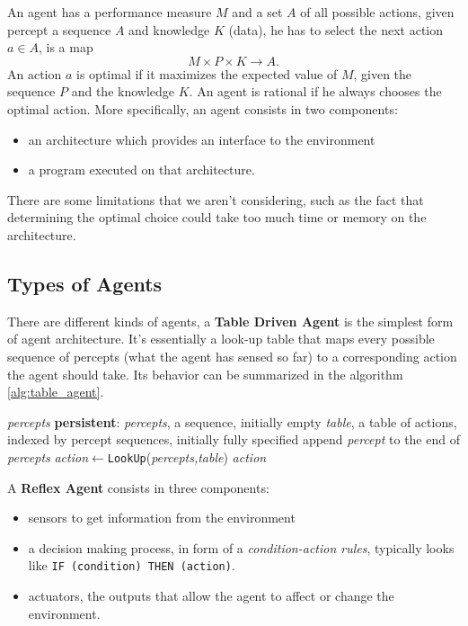 \documentclass[10pt, letterpaper]{report}
\begin{document}
An agent has a performance measure $M$ and a set $A$ of all possible actions, given percept a sequence $A$ and knowledge $K$ (data), he has to select the next action $a\in A$, is a map\begin{equation}
    M\times P\times K \longrightarrow A.
\end{equation} 
An action $a$ is optimal if it maximizes the expected value of $M$, given the sequence $P$ and the knowledge $K$. An agent is rational if he always chooses the optimal action. More specifically, an agent consists in two components:\begin{itemize}
    \item an architecture which provides an interface to the environment
    \item a program executed on that architecture.
\end{itemize}
There are some limitations that we aren't considering, such as the fact that determining the optimal choice could take too much time or memory on the architecture.

\subsection{Types of Agents}
There are different kinds of agents, a \textbf{Table Driven Agent} is the simplest form of agent architecture. It's essentially a look-up table that maps every possible sequence of percepts (what the agent has sensed so far) to a corresponding action the agent should take. Its behavior can be summarized in the algorithm \ref{alg:table_agent}.

\begin{algorithm}
    \caption{Table Driven Agent}\label{alg:table_agent}
    \begin{algorithmic}
    \Require \textit{percepts}
    \State \textbf{persistent}: \textit{percepts}, a sequence, initially empty
    \State\hphantom{persistent: .} \textit{table}, a table of actions, indexed by percept sequences, initially fully specified
    \State append \textit{percept} to the end of \textit{percepts} 
    \State \textit{action}$\leftarrow$\texttt{LookUp}(\textit{percepts,table})
    \State\Return \textit{action}
    \end{algorithmic}
\end{algorithm}
\bigskip


A \textbf{Reflex Agent} consists in three components:\begin{itemize}
    \item sensors to get information from the environment
    \item a decision making process, in form of a \textit{condition-action rules}, typically looks like \texttt{IF (condition) THEN (action)}.
    \item actuators, the outputs that allow the agent to affect or change the environment.
\end{itemize}
\end{document}
